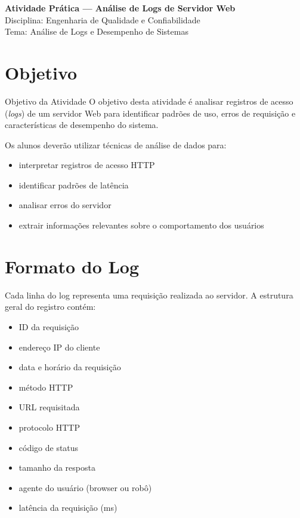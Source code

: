 \documentclass[12pt]{article}
\begin{document}

\vspace*{0.2cm}

\begin{center}
\Large \textbf{Atividade Prática — Análise de Logs de Servidor Web} \\

\normalsize Disciplina: Engenharia de Qualidade e Confiabilidade \\

\normalsize Tema: Análise de Logs e Desempenho de Sistemas
\end{center}

\vspace{0.5cm}

\section*{Objetivo}

\begin{block}{Objetivo da Atividade}
O objetivo desta atividade é analisar registros de acesso (\textit{logs}) de um servidor Web para identificar padrões de uso, erros de requisição e características de desempenho do sistema.

Os alunos deverão utilizar técnicas de análise de dados para:

\begin{itemize}
\item interpretar registros de acesso HTTP
\item identificar padrões de latência
\item analisar erros do servidor
\item extrair informações relevantes sobre o comportamento dos usuários
\end{itemize}

\end{block}

\section*{Formato do Log}

Cada linha do log representa uma requisição realizada ao servidor.  
A estrutura geral do registro contém:

\begin{itemize}
\item ID da requisição
\item endereço IP do cliente
\item data e horário da requisição
\item método HTTP
\item URL requisitada
\item protocolo HTTP
\item código de status
\item tamanho da resposta
\item agente do usuário (browser ou robô)
\item latência da requisição (ms)
\end{itemize}
\end{document}
